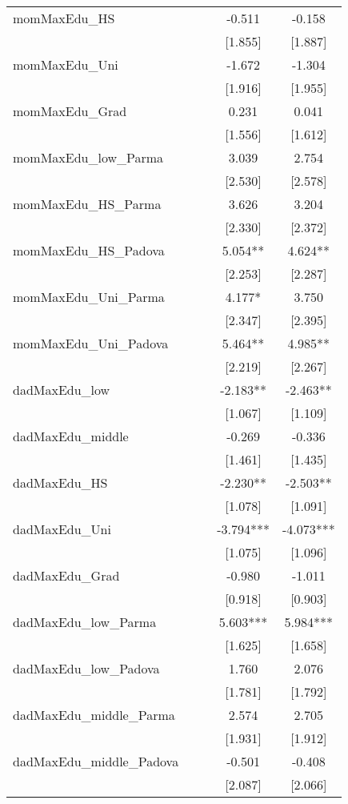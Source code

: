 \documentclass[]{article}
\begin{document}
\begin{tabular}{lcccc}
momMaxEdu\_HS &  &  & -0.511 & -0.158 \\
 &  &  & [1.855] & [1.887] \\
momMaxEdu\_Uni &  &  & -1.672 & -1.304 \\
 &  &  & [1.916] & [1.955] \\
momMaxEdu\_Grad &  &  & 0.231 & 0.041 \\
 &  &  & [1.556] & [1.612] \\
momMaxEdu\_low\_Parma &  &  & 3.039 & 2.754 \\
 &  &  & [2.530] & [2.578] \\
momMaxEdu\_HS\_Parma &  &  & 3.626 & 3.204 \\
 &  &  & [2.330] & [2.372] \\
momMaxEdu\_HS\_Padova &  &  & 5.054** & 4.624** \\
 &  &  & [2.253] & [2.287] \\
momMaxEdu\_Uni\_Parma &  &  & 4.177* & 3.750 \\
 &  &  & [2.347] & [2.395] \\
momMaxEdu\_Uni\_Padova &  &  & 5.464** & 4.985** \\
 &  &  & [2.219] & [2.267] \\
dadMaxEdu\_low &  &  & -2.183** & -2.463** \\
 &  &  & [1.067] & [1.109] \\
dadMaxEdu\_middle &  &  & -0.269 & -0.336 \\
 &  &  & [1.461] & [1.435] \\
dadMaxEdu\_HS &  &  & -2.230** & -2.503** \\
 &  &  & [1.078] & [1.091] \\
dadMaxEdu\_Uni &  &  & -3.794*** & -4.073*** \\
 &  &  & [1.075] & [1.096] \\
dadMaxEdu\_Grad &  &  & -0.980 & -1.011 \\
 &  &  & [0.918] & [0.903] \\
dadMaxEdu\_low\_Parma &  &  & 5.603*** & 5.984*** \\
 &  &  & [1.625] & [1.658] \\
dadMaxEdu\_low\_Padova &  &  & 1.760 & 2.076 \\
 &  &  & [1.781] & [1.792] \\
dadMaxEdu\_middle\_Parma &  &  & 2.574 & 2.705 \\
 &  &  & [1.931] & [1.912] \\
dadMaxEdu\_middle\_Padova &  &  & -0.501 & -0.408 \\
 &  &  & [2.087] & [2.066] \\

\end{tabular}
\end{document}
